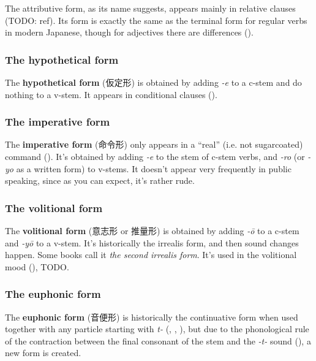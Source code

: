 \documentclass[UTF8, a4paper, oneside, scheme=plain]{ctexrep}
\newcommand*{\concept}[1]{\textbf{#1}}
\newcommand*{\term}[1]{\emph{#1}}
\newcommand{\corpus}[1]{\emph{#1}}
\begin{document}
The attributive form, as its name suggests, appears mainly in relative clauses (TODO: ref).
Its form is exactly the same as the terminal form for regular verbs in modern Japanese,
though for adjectives there are differences ().

\subsubsection{The hypothetical form}

The \concept{hypothetical form} (仮定形) is obtained by adding \corpus{-e} to a c-stem and do nothing to a v-stem.
It appears in conditional clauses ().

\subsubsection{The imperative form}\label{sec:imperative-form}

The \concept{imperative form} (命令形) only appears in a ``real'' (i.e. not sugarcoated) command 
().
It's obtained by adding \corpus{-e} to the stem of c-stem verbs,
and \corpus{-ro} (or \corpus{-yo} as a written form) to v-stems.
It doesn't appear very frequently in public speaking, 
since as you can expect, 
it's rather rude.

\subsubsection{The volitional form}\label{sec:volition-form}

The \concept{volitional form} (意志形 or 推量形)
is obtained by adding \corpus{-\={o}} to a c-stem and \corpus{-y\={o}} to a v-stem.
It's historically the irrealis form,
and then sound changes happen.
Some books call it \term{the second irrealis form}.
It's used in the volitional mood (), TODO.

\subsubsection{The euphonic form}\label{sec:euphonic-form}

The \concept{euphonic form} (音便形) is 
historically the continuative form when used together with any particle starting with \corpus{t-}
(, , ),
but due to the phonological rule of the contraction 
between the final consonant of the stem and the \corpus{-t-} sound (),
a new form is created. 
\end{document}
